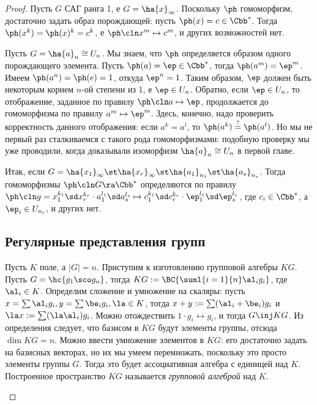 \documentclass[a4paper]{article}
\begin{document}
\begin{proof}
 Пусть $G$ САГ ранга 1, е $G = \ha{x}_\infty$. Поскольку $\ph$  гомоморфизм, достаточно задать
образ порождающей: пусть $\ph(x) = c \in \Cbb^*$. Тогда $\ph(x^k)=\ph(x)^k = c^k$, е $\ph\cln x^m \mapsto
c^m$, и других возможностей нет.

 Пусть $G = \ha{a}_n \cong U_n$. Мы знаем, что $\ph$ определяется  образом одного порождающего
элемента. Пусть $\ph(a) =\ep \in \Cbb^*$, тогда $\ph(a^m)=\ep^m$. Имеем $\ph(a^n)=\ph(e)=1$, откуда
$\ep^n=1$. Таким образом, $\ep$ должен быть некоторым корнем $n$-ой степени из 1, е $\ep \in U_n$.
Обратно, если $\ep \in U_n$, то отображение, заданное по правилу $\ph\cln a \mapsto \ep$, продолжается до
гомоморфизма по правилу $a^m \mapsto \ep^m$. Здесь, конечно, надо проверить корректность данного отображения:
если $a^k=a^l$, то $\ph(a^k)\overset{?}{=}\ph(a^l)$. Но мы не первый раз сталкиваемся с такого рода
гомоморфизмами: подобную проверку мы уже проводили, когда доказывали изоморфизм $\ha{a}_n \cong U_n$ в первой
главе.

Итак, если $G = \ha{x_1}_\infty\st \ha{x_r}_\infty\st\ha{a_1}_{n_1}\st \ha{a_s}_{n_s}$.  Тогда гомоморфизмы
$\ph\cln G \ra \Cbb^*$ определяются по правилу $\ph\cln g = x_1^{k_1}\sd x_r^{k_r}\cdot a_1^{l_1}\sd a_s^{l_s}
\mapsto c_1^{k_1}\sd c_r^{k_r}\cdot\ep_1^{l_1}\sd \ep_s^{l_s}$, где $c_i \in \Cbb^*$, а $\ep_i \in U_{n_i}$,
и других нет.

\subsection{Регулярные представления групп}

\begin{df}
Пусть $K$ поле, а $|G| = n$. Приступим к изготовлению групповой алгебры $KG$. Пусть $G = \hc{g_1\sco g_n}$, тогда $KG
:= \BC{\suml{i=1}{n}\al_ig_i}$, где $\al_i \in K$. Определим сложение и умножение на скаляры: пусть $x = \sum
\al_i g_i, y = \sum \be_i g_i, \la \in K$, тогда $x + y := \sum(\al_i + \be_i)g_i$ и $\la x := \sum (\la
\al_i) g_i$. Можно отождествить $1 \cdot g_i \leftrightarrow g_i$, и тогда $G \inj KG$. Из определения
следует, что базисом в $KG$ будут элементы группы, отсюда $\dim KG = n$. Можно ввести умножение элементов в
$KG$: его достаточно задать на базисных векторах, но их мы умеем перемножать, поскольку это просто элементы
группы $G$. Тогда это будет ассоциативная алгебра с единицей над $K$. Построенное пространство $KG$
называется \emph{групповой алгеброй} над $K$.
\end{df}


\end{proof}
\end{document}
